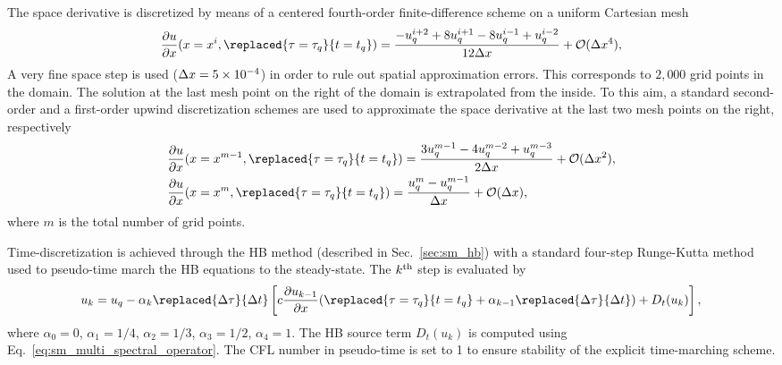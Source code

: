 The space derivative is discretized by means of a centered 
fourth-order finite-difference scheme on a uniform Cartesian mesh
\begin{equation}
    \frac{\partial u}{\partial x} (x = x^i, \replaced{\tau=\tau_q}{t=t_q}) =
    \frac{-u^{i+2}_{q} + 8 u^{i+1}_{q} - 8 u^{i-1}_{q} + u^{i-2}_{q}}{12\Delta x}
    + \mathcal{O} (\Delta x^4),
    \label{eq:convection_center4}
\end{equation}
A very fine space step is used ($\Delta x=5\e{-4}$) in order to rule 
out spatial approximation errors. This corresponds to $2,000$ grid points
in the domain. 
The solution at the last mesh 
point on the right of the domain is extrapolated 
from the inside. To this aim, a standard second-order 
and a first-order upwind discretization schemes
are used to approximate the space derivative at 
the last two mesh points on the right, respectively
\begin{equation}
    \begin{split}
        &\frac{\partial u}{\partial x} (x = x^{m-1}, \replaced{\tau=\tau_q}{t=t_q}) =
            \frac{3 u^{m-1}_{q} - 4 u^{m-2}_{q} + u^{m-3}_{q}}{2\Delta x} + \mathcal{O} (\Delta x^2), \\
        &\frac{\partial u}{\partial x} (x = x^m, \replaced{\tau=\tau_q}{t=t_q}) = 
            \frac{u^{m}_{q} - u^{m-1}_{q}}{\Delta x} + \mathcal{O} (\Delta x),
    \end{split}
\label{eq:upwind_scheme}
\end{equation}
where $m$ is the total number of grid points.

Time-discretization is achieved 
through the HB method (described in Sec.~\ref{sec:sm_hb})
with a standard four-step Runge-Kutta method~\cite{Jameson1981}
used to pseudo-time 
march the HB equations to the steady-state.
The $k\textsuperscript{th}$ step is evaluated by
\begin{equation}
    u_k = u_q - \alpha_k \replaced{\Delta \tau}{\Delta t} \left [ 
          c \frac{\partial u_{k-1}}{\partial x} 
          (\replaced{\tau=\tau_q}{t=t_q} + \alpha_{k-1} \replaced{\Delta \tau}{\Delta t})
          + D_t(u_k)
          \right],
    \label{eq:convection_rk4}
\end{equation}
where $\alpha_0 = 0$, $\alpha_1 = 1/4$, 
$\alpha_2 = 1/3$, $\alpha_3 = 1/2$, $\alpha_4 = 1$. 
The HB source term $D_t(u_k)$ is computed using Eq.~\eqref{eq:sm_multi_spectral_operator}.
The CFL number in pseudo-time is set to 1 
to ensure stability of the explicit time-marching scheme.

